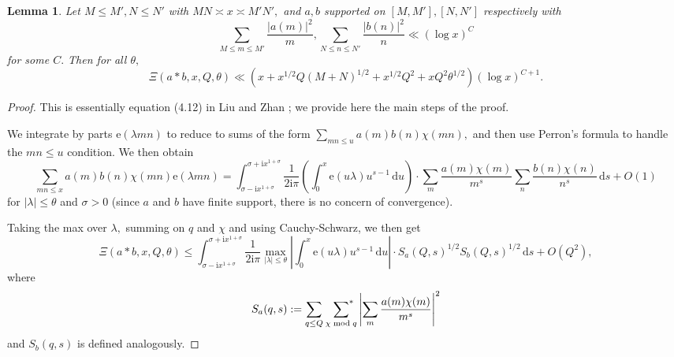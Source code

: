 \documentclass{article}
\newtheorem{lemma}[prop]{Lemma}
\newcommand{\e}{\mathrm{e}}
\newcommand{\de}{\,\mathrm{d}}
\newcommand{\ii}{\mathrm{i}}
\newcommand{\starsum}{\ \sideset{}{^*}\sum}
\begin{document}
\begin{lemma}\label{type-II}
    Let $M\le M', N\le N'$ with $MN \asymp x \asymp M'N',$ and $a, b$ supported on $[M,M'], [N,N']$ respectively with $$\sum_{M\le m \le M'} \frac{|a(m)|^2}{m}, \sum_{N\le n \le N'} \frac{|b(n)|^2}{n} \ll (\log x)^C$$ for some $C.$ 
    Then for all $\theta,$ $$\Xi(a * b, x, Q, \theta) %
    \ll \left(x + x^{1/2}Q(M+N)^{1/2} + x^{1/2}Q^2 + xQ^2\theta^{1/2}\right)(\log x)^{C+1}.$$
\end{lemma}
\begin{proof}
    This is essentially equation (4.12) in Liu and Zhan \cite{liuzhan}; we provide here the main steps of the proof.
    
    We integrate by parts $\e(\lambda mn)$ to reduce to sums of the form $\sum_{mn\le u} a(m) b(n) \chi(mn),$ and then use Perron's formula to handle the $mn \le u$ condition. We then obtain
    $$\sum_{mn\le x} a(m) b(n) \chi(mn) \e(\lambda mn) = \int_{\sigma - \ii x^{1+\sigma}}^{\sigma + \ii x^{1+\sigma}} \frac{1}{2\ii\pi} \left(\int_0^x \e(u\lambda) u^{s-1} \de u\right) \cdot \sum_m \frac{a(m)\chi(m)}{m^s} \sum_n \frac{b(n)\chi(n)}{n^s} \de s + O(1)$$
    for $|\lambda|\le\theta$ and $\sigma > 0$ (since $a$ and $b$ have finite support, there is no concern of convergence).

    Taking the max over $\lambda,$ summing on $q$ and $\chi$ and using Cauchy-Schwarz, we then get 
    \begin{equation}\label{step7}
        \Xi(a * b, x, Q, \theta) \le \int_{\sigma - \ii x^{1+\sigma}}^{\sigma + \ii x^{1+\sigma}} \frac{1}{2\ii\pi} \max_{|\lambda|\le\theta}\left|\int_0^x \e(u\lambda) u^{s-1} \de u\right| \cdot S_a(Q,s)^{1/2} S_b(Q,s)^{1/2} \de s + O(Q^2),
    \end{equation}
    where $$S_a(q,s) := \sum_{q\le Q} \starsum_{\chi\bmod q} \left|\sum_m \frac{a(m)\chi(m)}{m^s}\right|^2$$ and $S_b(q,s)$ is defined analogously.


\end{proof}
\end{document}
